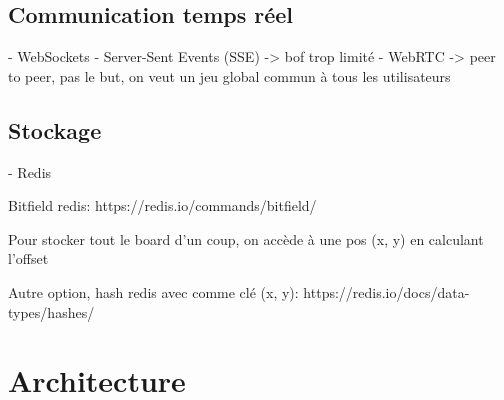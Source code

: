 \subsection{Communication temps réel}

- WebSockets
- Server-Sent Events (SSE) -> bof trop limité
- WebRTC -> peer to peer, pas le but, on veut un jeu global commun à tous les utilisateurs

\subsection{Stockage}

- Redis

Bitfield redis: https://redis.io/commands/bitfield/

Pour stocker tout le board d'un coup, on accède à une pos (x, y) en calculant l'offset

Autre option, hash redis avec comme clé (x, y): https://redis.io/docs/data-types/hashes/

\section{Architecture}
